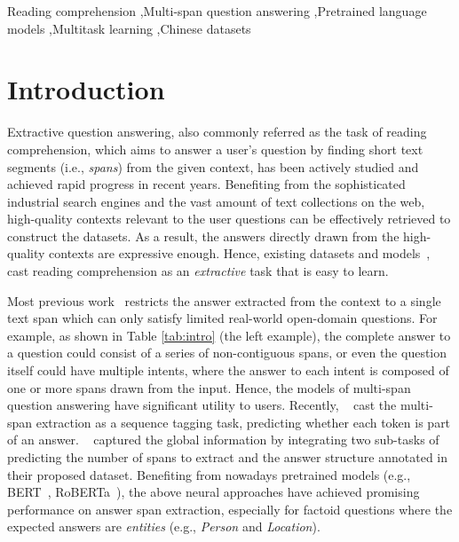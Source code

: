 \documentclass[a4paper]{cas-sc}
\newcommand{\1}[1]{\mathds{1}\left[#1\right]}
\newcommand{\tableref}[1]{Table \ref{#1}}
\begin{document}
	\begin{keywords}
		Reading comprehension \sep Multi-span question answering \sep  Pretrained language models \sep Multitask learning  \sep Chinese datasets 
	\end{keywords}
	\maketitle
	
	
%	
\section{Introduction}
\label{sec:introduction}

Extractive question answering, also commonly referred as the task of reading comprehension, which aims to answer a user's question by finding short text segments (i.e., {\em spans}) from the given context, has been actively studied and achieved rapid progress in recent years.
Benefiting from the sophisticated industrial search engines and the vast amount of text collections on the web, 
high-quality contexts relevant to the user questions can be effectively retrieved to construct the datasets.
As a result, the answers directly drawn from the high-quality contexts are expressive enough.
Hence, existing datasets and models~\citep{DBLP:conf/emnlp/DasigiLMSG19,li2022multispanqa,lee2023liquid,DBLP:journals/ipm/Liu0GC23}, cast reading comprehension as an \emph{extractive} task that is easy to learn.

Most previous work~\citep{rajpurkar2016squad,rajpurkar2018know,yang2018hotpotqa,zaheer2020big} restricts the answer extracted from the context to a single text span 
which can only satisfy limited real-world open-domain questions. 
For example, as shown in \tableref{tab:intro} (the left example), the complete answer to a question could consist of a series of non-contiguous spans, 
or even the question itself could have multiple intents, 
where the answer to each intent is composed of one or more spans drawn from the input.
Hence, the models of multi-span question answering have significant utility to users. 
Recently, ~\cite{segal2020simple} cast the multi-span extraction as a sequence tagging task, 
predicting whether each token is part of an answer. 
~\cite{li2022multispanqa} captured the global information by integrating two sub-tasks of predicting the number of spans to extract and the answer structure annotated in their proposed dataset. 
Benefiting from nowadays pretrained models (e.g., BERT~\citep{kenton2019bert}, RoBERTa~\citep{liu2019roberta}), 
the above neural approaches 
have achieved promising performance on answer span extraction,  
especially for factoid questions where the expected answers are \emph{entities} (e.g., \emph{Person} and \emph{Location}).
\end{document}
